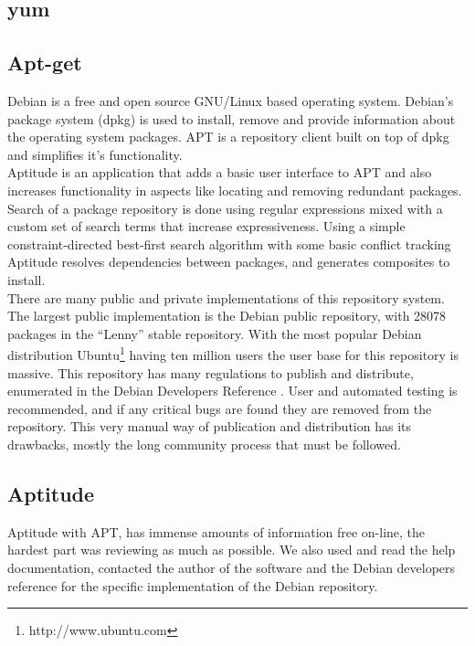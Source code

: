 \subsection{yum}

\subsection{Apt-get}

Debian is a free and open source GNU/Linux based operating system. 
Debian's package system (dpkg) is used to install, remove and provide information about the operating system packages. 
APT is a repository client built on top of dpkg and simplifies it's functionality.\\
Aptitude is an application that adds a basic user interface to APT and also increases functionality in aspects like 
locating and removing redundant packages. 
Search of a package repository is done using regular expressions mixed with a
custom set of search terms that increase expressiveness. Using a simple
constraint-directed best-first search algorithm with some basic conflict
tracking Aptitude resolves dependencies between packages, and generates
composites to install.\\ 
There are many public and private implementations of this repository system. 
The largest public implementation is the Debian public repository, with 28078 packages in the ``Lenny'' stable repository.
With the most popular Debian distribution Ubuntu\footnote{http://www.ubuntu.com} having ten million users \cite{vance_software_2009} the user base for this repository is massive.
This repository has many regulations to publish and distribute, enumerated in the Debian Developers Reference \cite{andreas_barth_debian_2008}. 
User and automated testing is recommended, and if any critical bugs are found they are removed from the repository. 
This very manual way of publication and
distribution has its drawbacks, mostly the long community process that must be followed.\\

\subsection{Aptitude}
Aptitude with APT, has immense amounts of information free on-line, the hardest part was reviewing as much as possible.
We also used and read the help documentation, contacted the author of the software \cite{burrows_modelling_2005} and
the Debian developers reference for the specific implementation of the Debian repository.


